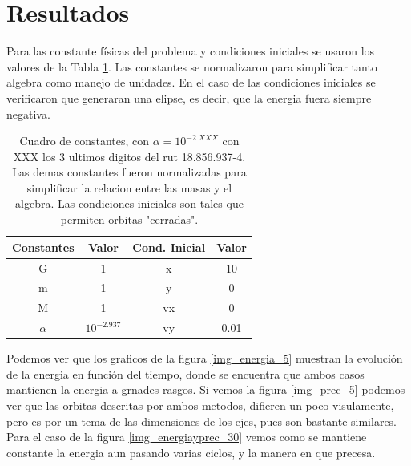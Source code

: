 \documentclass[10pt]{article}
\begin{document}
\section{Resultados}

Para las constante físicas del problema y condiciones iniciales se usaron los valores de la Tabla \ref{tab_const}. Las constantes se normalizaron para simplificar tanto algebra como manejo de unidades. En el caso de las condiciones iniciales se verificaron que generaran una elipse, es decir, que la energia fuera siempre negativa.  

\begin{table}[H]
\centering
\begin{tabular}{|c|c|c|c|}
\hline
Constantes & Valor & Cond. Inicial  & Valor \\
\hline
G & 1 & x & 10 \\
\hline
m & 1 & y & 0 \\
\hline
M & 1 & vx & 0 \\
\hline
$\alpha$ & $10^{-2.937}$ & vy & 0.01 \\
\hline
\end{tabular}
\caption{Cuadro de constantes, con $\alpha = 10^{-2.XXX}$ con XXX los 3 ultimos digitos del rut 18.856.937-4. Las demas constantes fueron normalizadas para simplificar la relacion entre las masas y el algebra. Las condiciones iniciales son tales que permiten orbitas "cerradas".}
\label{tab_const}
\end{table}

Podemos ver que los graficos de la figura \ref{img_energia_5} muestran la evolución de la energia en función del tiempo, donde se encuentra que ambos casos mantienen la energia a grnades rasgos. Si vemos la figura \ref{img_prec_5} podemos ver que las orbitas descritas por ambos metodos, difieren un poco visulamente, pero es por un tema de las dimensiones de los ejes, pues son bastante similares. Para el caso de la figura \ref{img_energiayprec_30} vemos como se mantiene constante la energia aun pasando varias ciclos, y la manera en que precesa.
\end{document}
